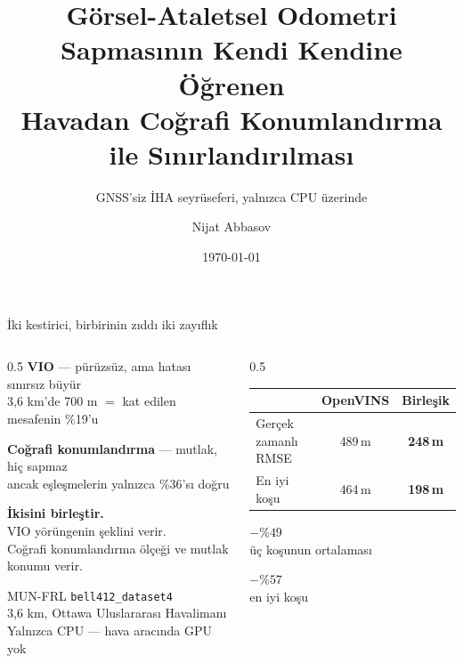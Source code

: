 \documentclass[aspectratio=169]{beamer}
\title{Görsel-Ataletsel Odometri Sapmasının Kendi Kendine Öğrenen\\
Havadan Coğrafi Konumlandırma ile Sınırlandırılması}
\subtitle{GNSS'siz İHA seyrüseferi, yalnızca CPU üzerinde}
\author{Nijat Abbasov}
\date{\today}
\begin{document}
\begin{frame}
\titlepage
\end{frame}

\begin{frame}{İki kestirici, birbirinin zıddı iki zayıflık}
\begin{columns}[T]
\begin{column}{0.5\textwidth}
\textbf{VIO} --- pürüzsüz, ama hatası sınırsız büyür\\
{\small 3,6 km'de 700 m $=$ kat edilen mesafenin \%19'u}

\vspace{0.9em}
\textbf{Coğrafi konumlandırma} --- mutlak, hiç sapmaz\\
{\small ancak eşleşmelerin yalnızca \%36'sı doğru}

\vspace{1.3em}
\textbf{İkisini birleştir.}\\
{\small VIO yörüngenin şeklini verir.\\
Coğrafi konumlandırma ölçeği ve mutlak konumu verir.}

\vspace{1.3em}
{\small MUN-FRL \texttt{bell412\_dataset4}\\
3,6 km, Ottawa Uluslararası Havalimanı\\
Yalnızca CPU --- hava aracında GPU yok}
\end{column}
\begin{column}{0.5\textwidth}
\centering
\vspace{1.5em}
\begin{tabular}{@{}lcc@{}}
\toprule
 & OpenVINS & Birleşik \\
\midrule
Gerçek zamanlı RMSE & 489\,m & \textbf{248\,m} \\
En iyi koşu & 464\,m & \textbf{198\,m} \\
\bottomrule
\end{tabular}

\vspace{2em}
{\large $-\%49$}\\[0.2em]
{\small üç koşunun ortalaması}

\vspace{1em}
{\large $-\%57$}\\[0.2em]
{\small en iyi koşu}
\end{column}
\end{columns}
\end{frame}
\end{document}
